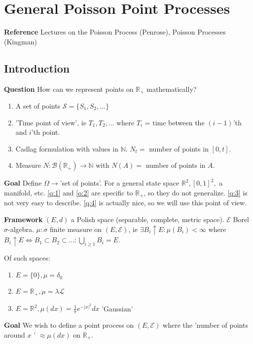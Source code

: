 \chapter{General Poisson Point Processes}
\textbf{Reference} Lectures on the Poisson Process (Penrose), Poisson Processes (Kingman)

\section{Introduction}
\textbf{Question} How can we represent points on $\mathbb{R}_+$ mathematically?
\begin{enumerate}
	\item A set of points $\mathcal{S}=\{S_1, S_2,...\}$ \label{q:3}
	\item 'Time point of view', ie $T_1,T_2,...$ where $T_i$ = time between the $(i-1) $'th and $i $'th point. \label{q:1}
	\item Cadlag formulation with values in $ \mathbb{N}$. $N_t=$ number of points in $[0,t]$. \label{q:2}
	\item Measure $N: \mathcal{B}(\mathbb{R}_+) \to \mathbb{N}$ with $N(A)=$ number of points in $A$. \label{q:4}
\end{enumerate}
\textbf{Goal} Define $\Omega \to $'set of points'. For a general state space $\mathbb{R}^2, [0,1]^2,$ a manifold, etc. 
\ref{q:1} and \ref{q:2} are specific to $\mathbb{R}_+$, so they do not generalize. \ref{q:3} is not very easy to describe. \ref{q:4} is actually nice, so we will  use this point of view.

\textbf{Framework} $(E,d)$ a Polish space (separable, complete, metric space). $\mathcal{E}$ Borel $\sigma$-algebra. $\mu: \sigma$ finite measure on $(E, \mathcal{E})$, ie  $\exists  B_i \uparrow E: \mu(B_i)<\infty$ where $B_i \uparrow E \iff B_1 \subset B_2 \subset...: \bigcup_{i\geq 1}B_i=E$.

\begin{ex}[] Of such spaces: 
\begin{enumerate}
	\item $E=\{0\}, \mu = \delta_0$
	\item $E=\mathbb{R}_+, \mu = \lambda \mathcal{L}$
	\item $E=\mathbb{R}^2, \mu(dx)=\frac{1}{\pi} e^{- |x|^2}dx$ 'Gaussian'
\end{enumerate}
\end{ex}

\textbf{Goal} We wish to define a point process on $(E, \mathcal{E})$ where the 'number of points around $x$ ' $\approx \mu(dx)$ on $\mathbb{R}_+$. 

